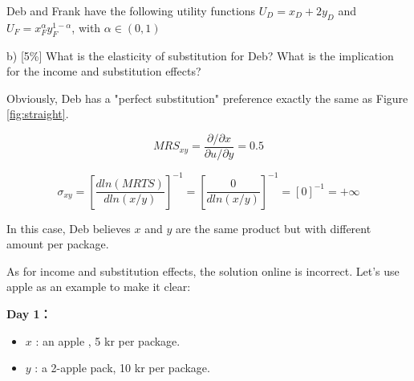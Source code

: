 \documentclass{article}
\begin{document}
Deb and Frank have the following utility functions
$U_D = x_D + 2y_D$ and $U_F = x^\alpha_Fy^{1-\alpha}_F$, with $\alpha \in (0,1)$

b) [5\%] What is the elasticity of substitution for Deb? What is the
implication for the income and substitution effects?

\vspace{2mm}

\begin{mdframed}[backgroundcolor=blue!20,linecolor=white]

Obviously, Deb has a "perfect substitution" preference exactly the same as Figure \ref{fig:straight}.

$$MRS_{xy} = \frac{\partial / \partial x}{\partial u / \partial y} = 0.5$$

$$\sigma_{xy} = [\frac{d ln(MRTS)}{d ln(x/y)}]^{-1} = [\frac{0}{d ln(x/y)}]^{-1}=[0]^{-1} = + \infty$$

In this case, Deb believes $x$ and $y$ are the same product but with different amount per package. 

As for income and substitution effects, the solution online is incorrect.
Let's use apple as an example to make it clear:

\vspace{2mm}

\textbf{Day 1：}

\begin{center}
\label{fig:fair}
\end{center}
\vspace{2mm}

\begin{itemize}
\item $x$ : an apple , 5 kr per package.
\item $y$ : a 2-apple pack, 10 kr per package.
\end{itemize}


\end{mdframed}
\end{document}
